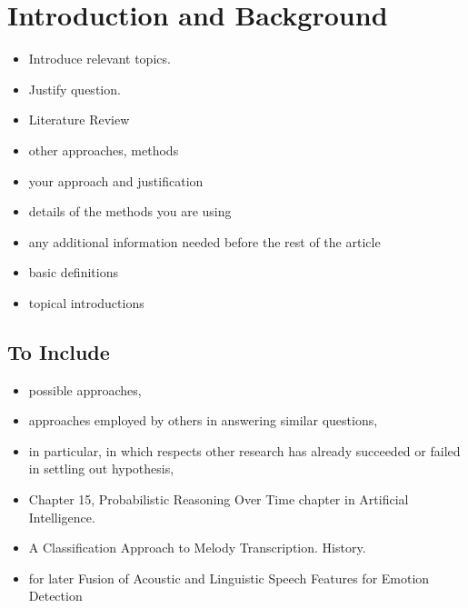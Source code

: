 \singlespace
 \section{Introduction and Background}
 \begin{itemize}
     \item Introduce relevant topics.
     \item Justify question.
     \item Literature Review
     \item other approaches, methods
     \item your approach and justification
     \item details of the methods you are using
     \item any additional information needed before the rest of the article
     \item basic definitions
     \item topical introductions
 \end{itemize}
 \subsection{To Include}
 \begin{itemize}
     \item possible approaches,
     \item approaches employed by others in answering similar questions,
     \item in particular, in which respects other research has already succeeded or failed in settling out hypothesis,
     \item \citep{Russell2009AIMA} Chapter 15, Probabilistic Reasoning Over Time chapter in Artificial Intelligence.
     \item \citep{Poliner2005CAMT} A Classification Approach to Melody Transcription. History.
     \item for later \citep{Metze2013FALFED} Fusion of Acoustic and Linguistic Speech Features for Emotion Detection

 \end{itemize}

